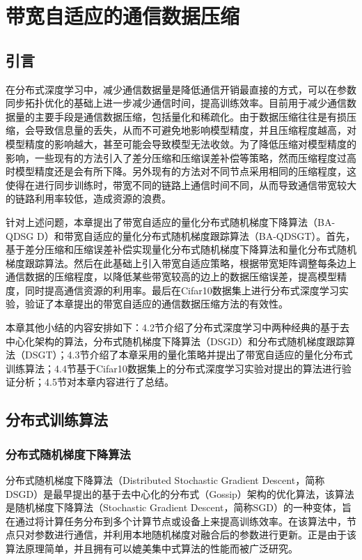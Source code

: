 \chapter{带宽自适应的通信数据压缩}
\section{引言}
在分布式深度学习中，减少通信数据量是降低通信开销最直接的方式，可以在参数同步拓扑优化的基础上进一步减少通信时间，提高训练效率。目前用于减少通信数据量的主要手段是通信数据压缩，包括量化和稀疏化。由于数据压缩往往是有损压缩，会导致信息量的丢失，从而不可避免地影响模型精度，并且压缩程度越高，对模型精度的影响越大，甚至可能会导致模型无法收敛。为了降低压缩对模型精度的影响，一些现有的方法引入了差分压缩和压缩误差补偿等策略，然而压缩程度过高时模型精度还是会有所下降。另外现有的方法对不同节点采用相同的压缩程度，这使得在进行同步训练时，带宽不同的链路上通信时间不同，从而导致通信带宽较大的链路利用率较低，造成资源的浪费。

针对上述问题，本章提出了带宽自适应的量化分布式随机梯度下降算法（BA-QDSG D）和带宽自适应的量化分布式随机梯度跟踪算法（BA-QDSGT）。首先，基于差分压缩和压缩误差补偿实现量化分布式随机梯度下降算法和量化分布式随机梯度跟踪算法。然后在此基础上引入带宽自适应策略，根据带宽矩阵调整每条边上通信数据的压缩程度，以降低某些带宽较高的边上的数据压缩误差，提高模型精度，同时提高通信资源的利用率。最后在Cifar10数据集上进行分布式深度学习实验，验证了本章提出的带宽自适应的通信数据压缩方法的有效性。

本章其他小结的内容安排如下：4.2节介绍了分布式深度学习中两种经典的基于去中心化架构的算法，分布式随机梯度下降算法（DSGD）和分布式随机梯度跟踪算法（DSGT）；4.3节介绍了本章采用的量化策略并提出了带宽自适应的量化分布式训练算法；4.4节基于Cifar10数据集上的分布式深度学习实验对提出的算法进行验证分析；4.5节对本章内容进行了总结。

\section{分布式训练算法}
\subsection{分布式随机梯度下降算法} \label{subsection-4-2-1}
分布式随机梯度下降算法（Distributed Stochastic Gradient Descent，简称DSGD）是最早提出的基于去中心化的分布式（Gossip）架构的优化算法，该算法是随机梯度下降算法（Stochastic Gradient Descent，简称SGD）的一种变体，旨在通过将计算任务分布到多个计算节点或设备上来提高训练效率。在该算法中，节点只对参数进行通信，并利用本地随机梯度对融合后的参数进行更新。正是由于该算法原理简单，并且拥有可以媲美集中式算法的性能而被广泛研究。


